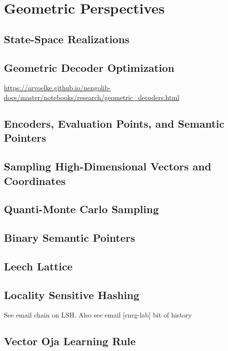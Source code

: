 \chapter{Geometric Perspectives}

\section{State-Space Realizations}

\section{Geometric Decoder Optimization}

\url{https://arvoelke.github.io/nengolib-docs/master/notebooks/research/geometric_decoders.html}

\section{Encoders, Evaluation Points, and Semantic Pointers}

\section{Sampling High-Dimensional Vectors and Coordinates}

\section{Quanti-Monte Carlo Sampling}

\section{Binary Semantic Pointers}

\section{Leech Lattice}

\section{Locality Sensitive Hashing}

See email chain on LSH. Also see email [cnrg-lab] bit of history


\section{Vector Oja Learning Rule}
